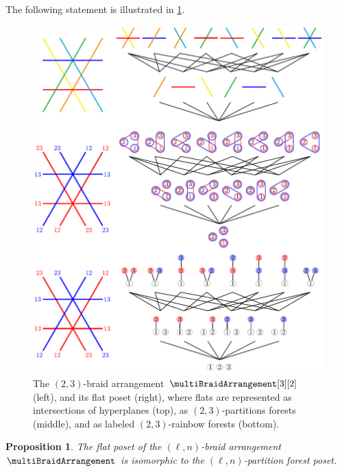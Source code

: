 \documentclass{amsart}
\newtheorem{proposition}[theorem]{Proposition}
\theoremstyle{definition}
\begin{document}
The following statement is illustrated in \cref{fig:intersectionPosetMultiBraidArrangement32}.
%
\begin{figure}
	\centerline{\includegraphics[scale=.9]{figures/intersectionPosetMultiBraidArrangement32Full}}
	\caption{The $(2,3)$-braid arrangement $\multiBraidArrangement[3][2]$ (left), and its flat poset (right), where flats are represented as intersections of hyperplanes (top), as $(2,3)$-partitions forests (middle), and as labeled $(2,3)$-rainbow forests (bottom).}
	\label{fig:intersectionPosetMultiBraidArrangement32}
\end{figure}

\begin{proposition}
\label{prop:flatPosetMultiBraidArrangement}
The flat poset of the $(\ell,n)$-braid arrangement~$\multiBraidArrangement$ is isomorphic to the $(\ell,n)$-partition forest poset.
\end{proposition}
\end{document}
